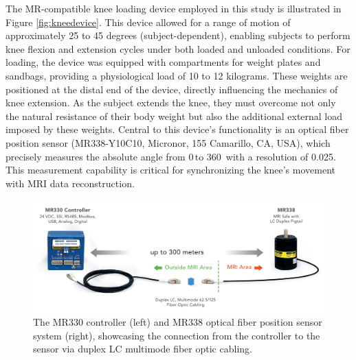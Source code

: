 \documentclass{micro-econ-thesis}
\begin{document}
The MR-compatible knee loading device employed in this study is illustrated in Figure \ref{fig:kneedevice}. This device allowed for a range of motion of approximately 25 to 45 degrees (subject-dependent), enabling subjects to perform knee flexion and extension cycles under both loaded and unloaded conditions. For loading, the device was equipped with compartments for weight plates and sandbags, providing a physiological load of 10 to 12 kilograms. These weights are positioned at the distal end of the device, directly influencing the mechanics of knee extension. As the subject extends the knee, they must overcome not only the natural resistance of their body weight but also the additional external load imposed by these weights. Central to this device's functionality is an optical fiber position sensor (MR338-Y10C10, Micronor, 155 Camarillo, CA, USA), which precisely  measures the ab­solute angle from 0{\degree}\,to 360\degree \, with a resolution of 0.025\degree \parencite{rickenbach_optical_2013}. This measurement capability is critical for synchronizing the knee's movement with MRI data reconstruction. 
\begin{figure} [H]
	\centering
	\includegraphics[width=0.7\linewidth]{sensor_img}
	\caption{The MR330 controller (left) and MR338 optical fiber position sensor system (right), showcasing the connection from the controller to the sensor via duplex LC multimode fiber optic cabling.}
	\label{fig:sensorimg}
\end{figure}
\end{document}
